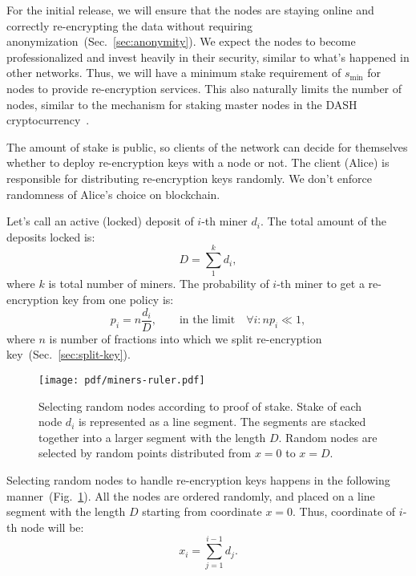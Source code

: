 \documentclass[longbibliography,nofootinbib]{revtex4-1}
\newcommand{\figref}[1]{Fig.~\ref{#1}}
\begin{document}
For the initial release, we will ensure that the nodes are staying online and correctly re-encrypting the data without requiring
anonymization~(Sec.~\ref{sec:anonymity}).
We expect the nodes to become professionalized and invest heavily in their security, similar to what's happened in other networks.
Thus, we will have a minimum stake requirement of $s_{\min}$ for nodes to provide re-encryption services.
This also naturally limits the number of nodes, similar to the mechanism for staking master nodes in the DASH cryptocurrency~\cite{dash:whitepaper}.

The amount of stake is public, so clients of the network can decide for themselves whether to deploy re-encryption keys with a node or not.
The client (Alice) is responsible for distributing re-encryption keys randomly.
We don't enforce randomness of Alice's choice on blockchain.

Let's call an active (locked) deposit of $i$-th miner $d_i$.
The total amount of the deposits locked is:
\begin{equation}
    D = \sum_1^k d_i,
\end{equation}
where $k$ is total number of miners.
The probability of $i$-th miner to get a re-encryption key from one policy is:
\begin{equation}
    p_i = n\frac{d_i}{D},\qquad\text{in the limit}\quad \forall i: n p_i \ll 1,
\end{equation}
where $n$ is number of fractions into which we split re-encryption key~(Sec.~\ref{sec:split-key}).

\begin{figure}
    \centering
    \texttt{[image: pdf/miners-ruler.pdf]}
    \caption{Selecting random nodes according to proof of stake.
             Stake of each node $d_i$ is represented as a line segment.
             The segments are stacked together into a larger segment with the length $D$.
             Random nodes are selected by random points distributed from $x=0$ to $x=D$.}
    \label{fig:random-nodes}
\end{figure}

Selecting random nodes to handle re-encryption keys happens in the following manner~(\figref{fig:random-nodes}).
All the nodes are ordered randomly, and placed on a line segment with the length $D$ starting from coordinate $x=0$.
Thus, coordinate of $i$-th node will be:
\begin{equation}
    x_i = \sum_{j=1}^{i-1} d_j.
\end{equation}
\end{document}
